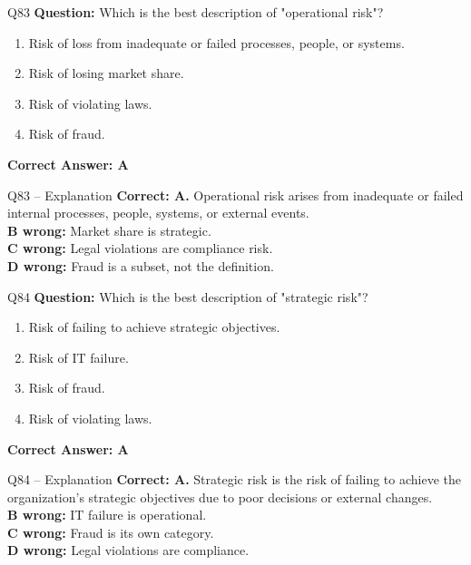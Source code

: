 \documentclass[aspectratio=169,10pt]{beamer}
\begin{document}
	\begin{frame}[t]{Q83}
		\small
		\textbf{Question:} Which is the best description of "operational risk"?
		\begin{enumerate}[label=\Alph*.,itemsep=1pt,topsep=2pt]
			\item Risk of loss from inadequate or failed processes, people, or systems.
			\item Risk of losing market share.
			\item Risk of violating laws.
			\item Risk of fraud.
		\end{enumerate}
		\vspace{4pt}
		\textbf{Correct Answer: A}
	\end{frame}
	
	\begin{frame}[t]{Q83 -- Explanation}
		\small
		\textbf{Correct: A.} Operational risk arises from inadequate or failed internal processes, people, systems, or external events. \\[4pt]
		\textbf{B wrong:} Market share is strategic. \\[2pt]
		\textbf{C wrong:} Legal violations are compliance risk. \\[2pt]
		\textbf{D wrong:} Fraud is a subset, not the definition.
	\end{frame}
	
	\begin{frame}[t]{Q84}
		\small
		\textbf{Question:} Which is the best description of "strategic risk"?
		\begin{enumerate}[label=\Alph*.,itemsep=1pt,topsep=2pt]
			\item Risk of failing to achieve strategic objectives.
			\item Risk of IT failure.
			\item Risk of fraud.
			\item Risk of violating laws.
		\end{enumerate}
		\vspace{4pt}
		\textbf{Correct Answer: A}
	\end{frame}
	
	\begin{frame}[t]{Q84 -- Explanation}
		\small
		\textbf{Correct: A.} Strategic risk is the risk of failing to achieve the organization's strategic objectives due to poor decisions or external changes. \\[4pt]
		\textbf{B wrong:} IT failure is operational. \\[2pt]
		\textbf{C wrong:} Fraud is its own category. \\[2pt]
		\textbf{D wrong:} Legal violations are compliance.
	\end{frame}
	
\end{document}
